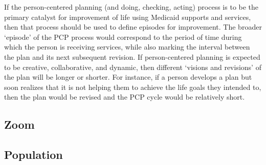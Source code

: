 \documentclass[
]{book}
\begin{document}
If the person-centered planning (and doing, checking, acting) process is to be the primary catalyst for improvement of life using Medicaid supports and services, then that process should be used to define episodes for improvement. The broader `episode' of the PCP process would correspond to the period of time during which the person is receiving services, while also marking the interval between the plan and its next subsequent revision. If person-centered planning is expected to be creative, collaborative, and dynamic, then different `visions and revisions' of the plan will be longer or shorter. For instance, if a person develops a plan but soon realizes that it is not helping them to achieve the life goals they intended to, then the plan would be revised and the PCP cycle would be relatively short.

\hypertarget{zoom}{%
\subsection{Zoom}\label{zoom}}

\hypertarget{pop}{%
\subsection{Population}\label{pop}}

  
\end{document}
